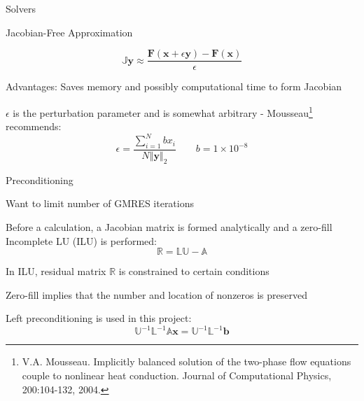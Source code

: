 \documentclass{beamer}
\begin{document}
\begin{section}{Solvers}
\begin{frame}{Jacobian-Free Approximation}
\begin{customlist}{2ex}{0pt}
  \[
   \mathbb{J}\mathbf{y}\approx\frac{\mathbf{F}\left(\mathbf{x}+\epsilon\mathbf{y}\right)-\mathbf{F}\left(\mathbf{x}\right)}{\epsilon}
  \]
  \vfill\item Advantages: Saves memory and possibly computational time to form Jacobian
  \vfill\item $\epsilon$ is the perturbation parameter and is somewhat arbitrary - Mousseau\footnote{V.A. Mousseau. Implicitly balanced solution of the two-phase flow equations couple to nonlinear heat
    conduction. Journal of Computational Physics, 200:104-132, 2004.} recommends:
  \[
   \epsilon=\frac{\sum_{i=1}^{N}bx_{i}}{N\left\Vert \mathbf{y}\right\Vert _{2}}\qquad b=1\times10^{-8}
  \]
\end{customlist}
\end{frame}
\begin{frame}{Preconditioning}
\begin{customlist}{2ex}{0pt}
  \item Want to limit number of GMRES iterations
  \vfill\item Before a calculation, a Jacobian matrix is formed analytically and a zero-fill Incomplete LU (ILU) is performed:
  \[
   \mathbb{R}=\mathbb{L}\mathbb{U}-\mathbb{A}
  \]
  \vfill\item In ILU, residual matrix $\mathbb{R}$ is constrained to certain conditions
  \vfill\item Zero-fill implies that the number and location of nonzeros is preserved
  \vfill\item Left preconditioning is used in this project:
  \[
   \mathbb{U}^{-1}\mathbb{L}^{-1}\mathbb{A}\mathbf{x}=\mathbb{U}^{-1}\mathbb{L}^{-1}\mathbf{b}
  \]
\end{customlist}
\end{frame}
\end{section}
\end{document}
